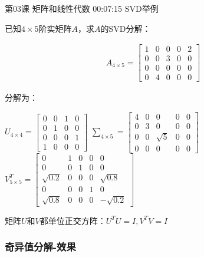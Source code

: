 \documentclass[UTF8]{ctexart}
\begin{document}
第03课 矩阵和线性代数 00:07:15 SVD举例

已知$4 \times 5$阶实矩阵$A$，求$A$的SVD分解：

\begin{equation}
\begin{aligned}
A_{4 \times 5}=
\begin{bmatrix}
1 & 0 & 0 & 0 & 2 \\
0 & 0 & 3 & 0 & 0 \\
0 & 0 & 0 & 0 & 0 \\
0 & 4 & 0 & 0 & 0
\end{bmatrix}
\end{aligned}
\end{equation}

分解为：

$U_{4 \times 4}=
\begin{bmatrix}
0 & 0 & 1 & 0 \\
0 & 1 & 0 & 0 \\
0 & 0 & 0 & 1 \\
1 & 0 & 0 & 0
\end{bmatrix}$ \quad
$\sum_{4 \times 5}=
\begin{bmatrix}
4 & 0 & 0 & 0 & 0 \\
0 & 3 & 0 & 0 & 0 \\
0 & 0 & \sqrt{5} & 0 & 0 \\
0 & 0 & 0 & 0 & 0
\end{bmatrix}$\quad
$V_{5 \times 5}^{T}=
\begin{bmatrix}
0 & 1 & 0 & 0 & 0 \\
0 & 0 & 1 & 0 & 0 \\
\sqrt{0.2} & 0 & 0 & 0 & \sqrt{0.8} \\
0 & 0 & 0 & 1 & 0 \\
\sqrt{0.8} & 0 & 0 & 0 & -\sqrt{0.2 }
\end{bmatrix}$\quad

矩阵$U$和$V$都单位正交方阵：$U^{T}U=I,V^{T}V=I$



\subsubsection{奇异值分解-效果}
\end{document}
